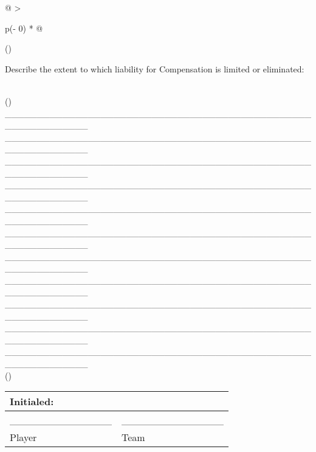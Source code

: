 \documentclass[
]{book}
\begin{document}
\begin{longtable}[]{@{}
  >{\raggedright\arraybackslash}p{(\columnwidth - 0\tabcolsep) * }@{}}
\toprule()
\begin{minipage}[b]{\linewidth}\raggedright
Describe the extent to which liability for Compensation is limited or eliminated:
\end{minipage} \\
\midrule()
\endhead
\_\_\_\_\_\_\_\_\_\_\_\_\_\_\_\_\_\_\_\_\_\_\_\_\_\_\_\_\_\_\_\_\_\_\_\_\_\_\_\_\_\_\_\_\_\_\_\_\_\_\_\_\_\_\_\_\_\_\_\_\_ \\
\_\_\_\_\_\_\_\_\_\_\_\_\_\_\_\_\_\_\_\_\_\_\_\_\_\_\_\_\_\_\_\_\_\_\_\_\_\_\_\_\_\_\_\_\_\_\_\_\_\_\_\_\_\_\_\_\_\_\_\_\_ \\
\_\_\_\_\_\_\_\_\_\_\_\_\_\_\_\_\_\_\_\_\_\_\_\_\_\_\_\_\_\_\_\_\_\_\_\_\_\_\_\_\_\_\_\_\_\_\_\_\_\_\_\_\_\_\_\_\_\_\_\_\_ \\
\_\_\_\_\_\_\_\_\_\_\_\_\_\_\_\_\_\_\_\_\_\_\_\_\_\_\_\_\_\_\_\_\_\_\_\_\_\_\_\_\_\_\_\_\_\_\_\_\_\_\_\_\_\_\_\_\_\_\_\_\_ \\
\_\_\_\_\_\_\_\_\_\_\_\_\_\_\_\_\_\_\_\_\_\_\_\_\_\_\_\_\_\_\_\_\_\_\_\_\_\_\_\_\_\_\_\_\_\_\_\_\_\_\_\_\_\_\_\_\_\_\_\_\_ \\
\_\_\_\_\_\_\_\_\_\_\_\_\_\_\_\_\_\_\_\_\_\_\_\_\_\_\_\_\_\_\_\_\_\_\_\_\_\_\_\_\_\_\_\_\_\_\_\_\_\_\_\_\_\_\_\_\_\_\_\_\_ \\
\_\_\_\_\_\_\_\_\_\_\_\_\_\_\_\_\_\_\_\_\_\_\_\_\_\_\_\_\_\_\_\_\_\_\_\_\_\_\_\_\_\_\_\_\_\_\_\_\_\_\_\_\_\_\_\_\_\_\_\_\_ \\
\_\_\_\_\_\_\_\_\_\_\_\_\_\_\_\_\_\_\_\_\_\_\_\_\_\_\_\_\_\_\_\_\_\_\_\_\_\_\_\_\_\_\_\_\_\_\_\_\_\_\_\_\_\_\_\_\_\_\_\_\_ \\
\_\_\_\_\_\_\_\_\_\_\_\_\_\_\_\_\_\_\_\_\_\_\_\_\_\_\_\_\_\_\_\_\_\_\_\_\_\_\_\_\_\_\_\_\_\_\_\_\_\_\_\_\_\_\_\_\_\_\_\_\_ \\
\_\_\_\_\_\_\_\_\_\_\_\_\_\_\_\_\_\_\_\_\_\_\_\_\_\_\_\_\_\_\_\_\_\_\_\_\_\_\_\_\_\_\_\_\_\_\_\_\_\_\_\_\_\_\_\_\_\_\_\_\_ \\
\_\_\_\_\_\_\_\_\_\_\_\_\_\_\_\_\_\_\_\_\_\_\_\_\_\_\_\_\_\_\_\_\_\_\_\_\_\_\_\_\_\_\_\_\_\_\_\_\_\_\_\_\_\_\_\_\_\_\_\_\_ \\
\bottomrule()
\end{longtable}

\begin{longtable}[]{@{}ll@{}}
\toprule()
Initialed: & \\
\midrule()
\endhead
\_\_\_\_\_\_\_\_\_\_\_\_\_\_ & \_\_\_\_\_\_\_\_\_\_\_\_\_\_ \\
Player & Team \\
\bottomrule()
\end{longtable}
\end{document}
